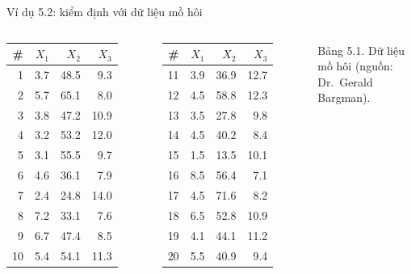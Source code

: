 \begin{frame}{Ví dụ 5.2: kiểm định với dữ liệu mồ hôi}
  \begin{columns}[T,onlytextwidth]
    \centering
    \footnotesize
    \renewcommand{\arraystretch}{0.95}
    \setlength{\tabcolsep}{4pt}
    \begin{tabular}{@{}rrrr@{}}
      \toprule
      \# & \(X_1\) & \(X_2\) & \(X_3\) \\
      \midrule
      1  & 3.7 & 48.5 &  9.3 \\
      2  & 5.7 & 65.1 &  8.0 \\
      3  & 3.8 & 47.2 & 10.9 \\
      4  & 3.2 & 53.2 & 12.0 \\
      5  & 3.1 & 55.5 &  9.7 \\
      6  & 4.6 & 36.1 &  7.9 \\
      7  & 2.4 & 24.8 & 14.0 \\
      8  & 7.2 & 33.1 &  7.6 \\
      9  & 6.7 & 47.4 &  8.5 \\
      10 & 5.4 & 54.1 & 11.3 \\
      \bottomrule
    \end{tabular}
    \hspace{0.25cm}
    \begin{tabular}{@{}rrrr@{}}
      \toprule
      \# & \(X_1\) & \(X_2\) & \(X_3\) \\
      \midrule
      11 & 3.9 & 36.9 & 12.7 \\
      12 & 4.5 & 58.8 & 12.3 \\
      13 & 3.5 & 27.8 &  9.8 \\
      14 & 4.5 & 40.2 &  8.4 \\
      15 & 1.5 & 13.5 & 10.1 \\
      16 & 8.5 & 56.4 &  7.1 \\
      17 & 4.5 & 71.6 &  8.2 \\
      18 & 6.5 & 52.8 & 10.9 \\
      19 & 4.1 & 44.1 & 11.2 \\
      20 & 5.5 & 40.9 &  9.4 \\
      \bottomrule
    \end{tabular}

    \vspace{0.1cm}
    {\color{hustgray}Bảng 5.1. Dữ liệu mồ hôi (nguồn: Dr.\ Gerald Bargman).}


\end{columns}
\end{frame}

